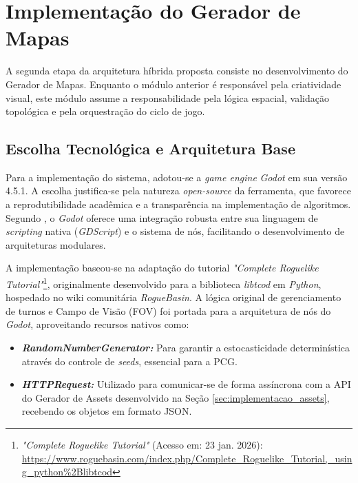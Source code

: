 
\section{Implementação do Gerador de Mapas}
\label{sec:implementacao_mapas}

A segunda etapa da arquitetura híbrida proposta consiste no desenvolvimento do
Gerador de Mapas. Enquanto o módulo anterior é responsável pela criatividade
visual, este módulo assume a responsabilidade pela lógica espacial, validação
topológica e pela orquestração do ciclo de jogo.

\subsection{Escolha Tecnológica e Arquitetura Base}

Para a implementação do sistema, adotou-se a \textit{game engine} \textit{Godot} em sua
versão 4.5.1. A escolha justifica-se pela natureza \textit{open-source} da
ferramenta, que favorece a reprodutibilidade acadêmica e a transparência na
implementação de algoritmos. Segundo , o \textit{Godot}
oferece uma integração robusta entre sua linguagem de \textit{scripting} nativa
(\textit{GDScript}) e o sistema de nós, facilitando o desenvolvimento de arquiteturas
modulares.

A implementação baseou-se na adaptação do tutorial \textit{"Complete Roguelike
    Tutorial"}\footnote{\textit{"Complete Roguelike
        Tutorial"} (Acesso em: 23 jan. 2026): \url{https://www.roguebasin.com/index.php/Complete\_Roguelike\_Tutorial,\_using\_python\%2Blibtcod}},
originalmente desenvolvido para a biblioteca \textit{libtcod} em \textit{Python},
hospedado no wiki comunitária \textit{RogueBasin}. A lógica original de
gerenciamento de turnos e Campo de Visão (\gls{FOV}) foi
portada para a arquitetura de nós do \textit{Godot}, aproveitando recursos nativos como:

\begin{itemize}
    \item \textbf{\textit{RandomNumberGenerator:}} Para garantir a estocasticidade
          determinística através do controle de \textit{seeds}, essencial para a
          \gls{PCG}.
    \item \textbf{\textit{HTTPRequest:}} Utilizado para comunicar-se de forma assíncrona
          com a API do Gerador de Assets desenvolvido na Seção
          \ref{sec:implementacao_assets}, recebendo os objetos em formato \gls{JSON}.
\end{itemize}

